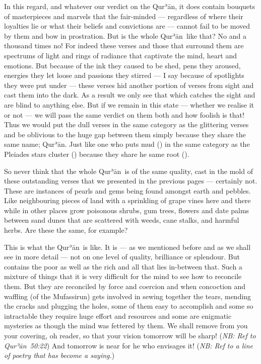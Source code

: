 \documentclass[12pt]{memoir}
\def\´{ʾ} %
\newcommand{\ar}[1]{\RL{\arabicfont#1}}
\def \Quran{Qur\-\´ān} %
\def\–{-\hskip0pt}
\newcommand{\QRef}[1]{{\color{darkblue}#1}}
\newcommand{\NB}[1]{\emph{\small NB: #1}}
\begin{document}
In this regard, and whatever our verdict on the \Quran,
it does contain bouquets of masterpieces and marvels that the fair\–minded —
regardless of where their loyalties lie or
what their beliefs and convictions are —
cannot fail to be moved by them and bow in prostration.
But is the whole \Quran\ like that?
No and a thousand times no!
For indeed these verses and those that surround them
are spectrums of light and rings of radiance
that captivate the mind, heart and emotions.
But because of the ink they caused to be shed, pens they aroused,
energies they let loose and passions they stirred —
I say because of spotlights they were put under —
these verses hid another portion of verses from sight
and cast them into the dark.
As a result we only see that which catches the sight
and are blind to anything else.
But if we remain in this state — whether we realise it or not —
we will pass the same verdict on them both and how foolish is that!
Thus we would put the dull verses in the same category as the glittering verses
and be oblivious to the huge gap between them
simply because they share the same name; \Quran.
Just like one who puts mud (\ar{الثرى}) in the same category
as the Pleiades stars cluster (\ar{الثريا})
because they share he same root (\ar{ث ر ي}).

So never think that the whole \Quran\ is of the same quality,
cast in the mold of these outstanding verses
that we presented in the previous pages — certainly not.
These are instances of pearls and gems being found amongst earth and pebbles.
Like neighbouring pieces of land with a sprinkling of grape vines here
and there while in other places grow poisonous shrubs, gum trees,
flowers and date palms between sand dunes that are scattered
with weeds, cane stalks, and harmful herbs.
Are these the same, for example?

This is what the \Quran\ is like.
It is — as we mentioned before and as we shall see in more detail —
not on one level of quality, brilliance or splendour.
But contains the poor as well as the rich and all that lies in\–between that.
Such a mixture of things that it is very difficult
for the mind to see how to reconcile them.
But they are reconciled by force and coercion
and when concoction and waffling (of the Mufassirun)
gets involved in sewing together the tears,
mending the cracks and plugging the holes,
some of them easy to accomplish and some so intractable
they require huge effort and resources and some are enigmatic mysteries
as though the mind was fettered by them.
We shall remove from you your covering, oh reader,
so that your vision tomorrow will be sharp!
(\NB{Ref to \Quran\ \QRef{50:22}})
And tomorrow is near for he who envisages it!
(\NB{Ref to a line of poetry that has become a saying.})
\end{document}
